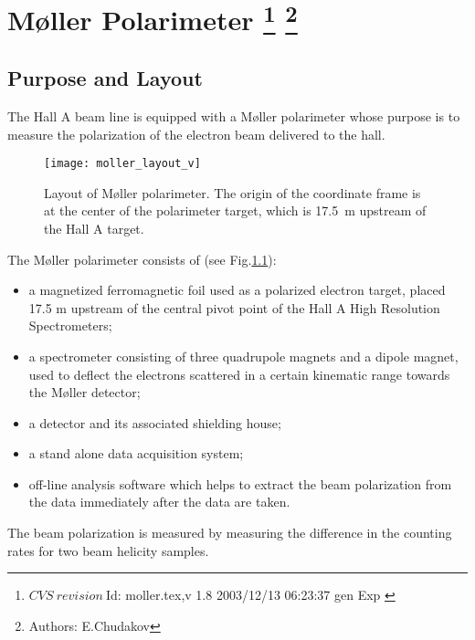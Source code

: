 \chapter[M{\o}ller Polarimeter]{M{\o}ller Polarimeter
\footnote{
  $CVS~revision~ $Id: moller.tex,v 1.8 2003/12/13 06:23:37 gen Exp $ $
}
\footnote{Authors: E.Chudakov }
}
\label{sec:moller}
\section {Purpose and Layout}
\label{sec:moller_purpose}

The Hall A beam line is equipped with a M{\o}ller 
polarimeter
whose purpose is 
to measure the polarization of the electron beam delivered to the hall. 

 \begin{figure}[bht]
    \begin{center}
        \texttt{[image: moller\_layout\_v]}
    \end{center}
    \caption[M{\o}ller: layout]{
            Layout of M{\o}ller polarimeter. The origin of the 
            coordinate frame is at the center of the polarimeter
             target, which is 17.5~m upstream of the Hall A target.
            }
    \label{fig:moller_layout} 
 \end{figure}  

The M{\o}ller polarimeter consists of (see Fig.\ref{fig:moller_layout}):
\begin{itemize}
\item  a magnetized ferromagnetic foil used as a polarized electron target,
       placed 17.5 m upstream of the central 
       pivot point of the Hall A High Resolution Spectrometers;

\item a spectrometer consisting of three quadrupole magnets and a dipole magnet,
      used to deflect the electrons scattered in a certain kinematic
      range towards the M{\o}ller detector;

\item a detector and its associated shielding house;
\item a stand alone data acquisition system;
\item off-line analysis software which helps to extract the beam polarization
      from the data immediately after the data are taken. 
\end{itemize}

The beam polarization is measured by measuring the difference
in the counting rates for two beam helicity samples.  

